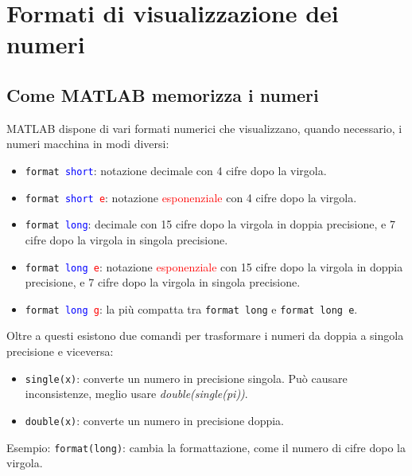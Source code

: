 \chapter{Formati di visualizzazione dei numeri}
\section{Come MATLAB memorizza i numeri}
MATLAB dispone di vari formati numerici che visualizzano, quando necessario, i numeri macchina in modi diversi:
\begin{itemize}

	\item	\texttt{format \textcolor{blue}{short}}: notazione decimale con 4 cifre dopo la virgola.
	
	\item	\texttt{format \textcolor{blue}{short} \textcolor{red}{e}}: notazione \textcolor{red}{esponenziale} 
			con 4 cifre dopo la virgola.
			
	\item	\texttt{format \textcolor{blue}{long}}: decimale con 15 cifre dopo la virgola in doppia precisione, e 
			7 cifre dopo la virgola in singola precisione.
			
	\item	\texttt{format \textcolor{blue}{long} \textcolor{red}{e}}: notazione \textcolor{red}{esponenziale} 
			con 15 cifre dopo la virgola in doppia precisione, e 7 cifre dopo la virgola in singola precisione.
			
	\item	\texttt{format \textcolor{blue}{long} \textcolor{red}{g}}: la più compatta tra \texttt{format long} e 
			\texttt{format long e}.

\end{itemize}

Oltre a questi esistono due comandi per trasformare i numeri da doppia a singola precisione e viceversa:
\begin{itemize}

	\item	\texttt{single(x)}: converte un numero in precisione singola. Può causare inconsistenze, meglio usare 
	\textit{double(single(pi))}.
	
	\item 	\texttt{double(x)}: converte un numero in precisione doppia.
\end{itemize}

Esempio: \texttt{format(long)}: cambia la formattazione, come il numero di cifre dopo la virgola.